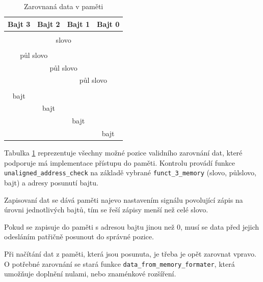 \documentclass[FM,BP]{tulthesis}
\begin{document}
\begin{table}[h]
    \caption{Zarovnaná data v paměti}
    \label{table:zarovnana pamet}
    \begin{center}
        \begin{tabular}{|c|c|c|c|}
        \hline
        \textbf{Bajt 3} & 
        \textbf{Bajt 2} & 
        \textbf{Bajt 1} & 
        \textbf{Bajt 0}
        \\
        \hline
        \multicolumn{4}{|c|}{} \\
        \hline
        \multicolumn{4}{|c|}{slovo}\\
        \hline
        \multicolumn{4}{|c|}{}\\
        \cline{0-1}
        \multicolumn{2}{|c|}{půl slovo} & \multicolumn{2}{c|}{} \\
        \cline{0-2}
        & \multicolumn{2}{c|}{půl slovo} & \\
        \cline{2-4}
        \multicolumn{2}{|c}{} & \multicolumn{2}{|c|}{půl slovo} \\
        \cline{3-4}
        \multicolumn{4}{|c|}{} \\
        \cline{0-0}
        bajt & \multicolumn{3}{c|}{}
        \\
        \cline{0-1}
        & bajt & \multicolumn{2}{c|}{} \\
        \cline{2-3}
        \multicolumn{2}{|c|}{} & bajt & \\
        \cline{3-4}
        \multicolumn{3}{|c|}{} & bajt \\
        \hline
        \end{tabular}
    \end{center}
\end{table}

Tabulka \ref{table:zarovnana pamet} reprezentuje všechny možné pozice validního zarovnání dat, které podporuje má implementace přístupu do paměti. Kontrolu provádí funkce \verb|unaligned_address_check| na základě vybrané \verb|funct_3_memory| (slovo, půlslovo, bajt) a adresy posunutí bajtu. 

Zapisovaní dat se dává paměti najevo nastavením signálu povolující zápis na úrovni jednotlivých bajtů, tím se řeší zápisy menší než celé slovo.

Pokud se zapisuje do paměti s adresou bajtu jinou než 0, musí se data před jejich odesláním patřičně posunout do správné pozice.

Při načítání dat z paměti, která jsou posunuta, je třeba je opět zarovnat vpravo. O potřebné zarovnání se stará funkce \verb|data_from_memory_formater|, která umožňuje doplnění nulami, nebo znaménkové rozšíření. 
\end{document}
